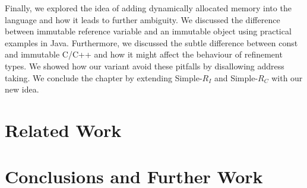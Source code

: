 \documentclass[a4paper,12pt]{report}
\begin{document}
\par
Finally, we explored the idea of adding dynamically allocated memory into the 
language and how it leads to further ambiguity. We discussed the difference between 
immutable reference variable and an immutable object using practical examples in 
Java. Furthermore, we discussed the subtle difference between const and 
immutable C/C++ and how it might affect the behaviour of refinement types. We 
showed how our variant avoid these pitfalls by disallowing address taking. We 
conclude the chapter by extending Simple-$R_{I}$ and Simple-$R_{C}$ with our new  
idea. 

\chapter{Related Work} \label{chapter:related_work}

\chapter{Conclusions and Further Work} \label{chapter:further_work}


\appendix
\singlespacing

\printbibliography
\end{document}
